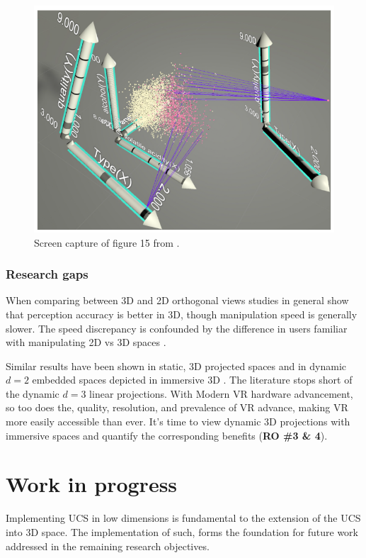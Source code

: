 \documentclass{monashthesis}
\begin{document}
\begin{figure}

{\centering \includegraphics[width=0.5\linewidth]{./figures/cordeil2017fig} 

}

\caption{Screen capture of figure 15 from
\textcite{cordeil_imaxes:_2017}.}\label{fig:cordeil2017fig}
\end{figure}

\subsection{Research gaps}\label{research-gaps-1}

When comparing between 3D and 2D orthogonal views studies in general
show that perception accuracy is better in 3D, though manipulation speed
is generally slower. The speed discrepancy is confounded by the
difference in users familiar with manipulating 2D vs 3D spaces
\autocites{lee_effects_1986}{wickens_implications_1994}{tory_visualization_2006}[counter
example][]{sedlmair_empirical_2013}.

Similar results have been shown in static, 3D projected spaces
\autocites{gracia_new_2016}{wagner_filho_immersive_2018} and in dynamic
\(d=2\) embedded spaces depicted in immersive 3D
\autocite{nelson_xgobi_1998}. The literature stops short of the dynamic
\(d=3\) linear projections. With Modern VR hardware advancement, so too
does the, quality, resolution, and prevalence of VR advance, making VR
more easily accessible than ever. It's time to view dynamic 3D
projections with immersive spaces and quantify the corresponding
benefits (\textbf{RO \#3 \& 4}).

\chapter{Work in progress}\label{ch:workinprogress}

Implementing UCS in low dimensions is fundamental to the extension of
the UCS into 3D space. The implementation of such, forms the foundation
for future work addressed in the remaining research objectives.
\end{document}
